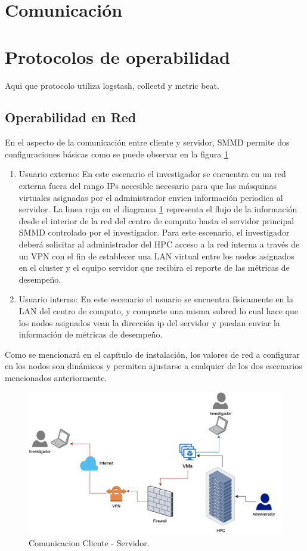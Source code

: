 \newpage

\section{Comunicación}

\section{Protocolos de operabilidad}
Aqui que protocolo utiliza logstash, collectd y metric beat.


\subsection{Operabilidad en Red}
En el aspecto de la comunicación entre cliente y servidor, SMMD permite dos configuraciones básicas como se puede observar en la figura \ref{fig:modelo-comunicacion} 

\begin{enumerate}
	\item Usuario externo: En este escenario el investigador se encuentra en un red externa fuera del rango IPs accesible necesario para que las másquinas virtuales asignadas por el administrador envien información periodica al servidor. La linea roja en el diagrama \ref{fig:modelo-comunicacion} representa el flujo de la información desde el interior de la red del centro de computo hasta el servidor principal SMMD controlado por el investigador. Para este escenario, el investigador deberá solicitar al administrador del HPC acceso a la red interna a través de un VPN con el fin de establecer una LAN virtual entre los nodos asignados en el cluster y el equipo servidor que recibira el reporte de las métricas de desempeño.
	\item Usuario interno: En este escenario el usuario se encuentra físicamente en la LAN del centro de computo, y comparte una misma subred lo cual hace que los nodos asignados vean la dirección ip del servidor y puedan enviar la información de métricas de desempeño.
\end{enumerate}
Como se mencionará en el capítulo de instalación, los valores de red a configurar en los nodos son dinámicos y permiten ajustarse a cualquier de los dos escenarios mencionados anteriormente.

\begin{figure}[h]
 \centering
  \includegraphics[width=0.9\linewidth]{./imagenes/comunicacion.png}
  \caption{Comunicacion Cliente - Servidor.}
  \label{fig:modelo-comunicacion}
\end{figure}
\newpage
